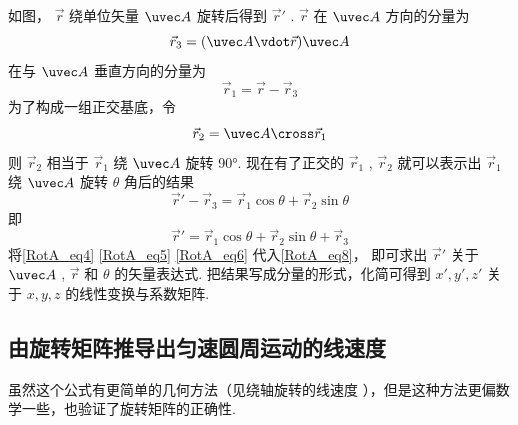 如图， $\vec r$ 绕单位矢量 $\uvec A$ 旋转后得到 $\vec r'$ .  $\vec r$ 在 $\uvec A$ 方向的分量为   
\begin{equation}\label{RotA_eq4}
\vec r_3 = (\uvec A \vdot \vec r)\uvec A
\end{equation}
在与 $\uvec A$ 垂直方向的分量为
\begin{equation}\label{RotA_eq5}
\vec r_1 = \vec r - \vec r_3
\end{equation}
为了构成一组正交基底，令
\begin{equation}\label{RotA_eq6}
\vec r_2 = \uvec A \cross \vec r_1
\end{equation}
则 $\vec r_2$ 相当于 $\vec r_1$ 绕 $\uvec A$ 旋转 90°. 现在有了正交的 $\vec r_1$ , $\vec r_2$  就可以表示出 $\vec r_1$ 绕 $\uvec A$ 旋转 $\theta$ 角后的结果
\begin{equation}
\vec r' - \vec r_3 = \vec r_1\cos \theta  + \vec r_2\sin \theta
\end{equation}
即
\begin{equation}\label{RotA_eq8}
\vec r' = \vec r_1\cos \theta  + \vec r_2\sin \theta  + \vec r_3
\end{equation} 
将\autoref{RotA_eq4} \autoref{RotA_eq5} \autoref{RotA_eq6} 代入\autoref{RotA_eq8}， 即可求出 $\vec r'$ 关于 $\uvec A$ , $\vec r$ 和 $\theta $ 的矢量表达式. 把结果写成分量的形式，化简可得到 $x',y',z'$ 关于 $x,y,z$ 的线性变换与系数矩阵.

\subsection{由旋转矩阵推导出匀速圆周运动的线速度} 

虽然这个公式有更简单的几何方法（见绕轴旋转的线速度%
），但是这种方法更偏数学一些，也验证了旋转矩阵的正确性.

